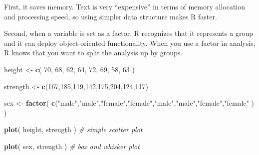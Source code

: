 \documentclass[]{book}
\newenvironment{Shaded}{\begin{snugshade}}{\end{snugshade}}
\newcommand{\CommentTok}[1]{\textcolor[rgb]{0.56,0.35,0.01}{\textit{#1}}}
\newcommand{\DecValTok}[1]{\textcolor[rgb]{0.00,0.00,0.81}{#1}}
\newcommand{\KeywordTok}[1]{\textcolor[rgb]{0.13,0.29,0.53}{\textbf{#1}}}
\newcommand{\NormalTok}[1]{#1}
\newcommand{\StringTok}[1]{\textcolor[rgb]{0.31,0.60,0.02}{#1}}
\theoremstyle{definition}
\theoremstyle{definition}
\theoremstyle{definition}
\theoremstyle{remark}
\begin{document}
First, it saves memory. Text is very ``expensive'' in terms of memory
allocation and processing speed, so using simpler data structure makes R
faster.

Second, when a variable is set as a factor, R recognizes that it
represents a group and it can deploy object-oriented functionality. When
you use a factor in analysis, R knows that you want to split the
analysis up by groups.

\begin{Shaded}
\begin{Highlighting}[]
\NormalTok{height <-}\StringTok{ }\KeywordTok{c}\NormalTok{( }\DecValTok{70}\NormalTok{, }\DecValTok{68}\NormalTok{, }\DecValTok{62}\NormalTok{, }\DecValTok{64}\NormalTok{, }\DecValTok{72}\NormalTok{, }\DecValTok{69}\NormalTok{, }\DecValTok{58}\NormalTok{, }\DecValTok{63}\NormalTok{  )}

\NormalTok{strength <-}\StringTok{ }\KeywordTok{c}\NormalTok{(}\DecValTok{167}\NormalTok{,}\DecValTok{185}\NormalTok{,}\DecValTok{119}\NormalTok{,}\DecValTok{142}\NormalTok{,}\DecValTok{175}\NormalTok{,}\DecValTok{204}\NormalTok{,}\DecValTok{124}\NormalTok{,}\DecValTok{117}\NormalTok{)}

\NormalTok{sex <-}\StringTok{ }\KeywordTok{factor}\NormalTok{( }\KeywordTok{c}\NormalTok{(}\StringTok{"male"}\NormalTok{,}\StringTok{"male"}\NormalTok{,}\StringTok{"female"}\NormalTok{,}\StringTok{"female"}\NormalTok{,}\StringTok{"male"}\NormalTok{,}\StringTok{"male"}\NormalTok{,}\StringTok{"female"}\NormalTok{,}\StringTok{"female"}\NormalTok{ ) )}

\KeywordTok{plot}\NormalTok{( height, strength )   }\CommentTok{# simple scatter plot}

\KeywordTok{plot}\NormalTok{( sex, strength )      }\CommentTok{# box and whisker plot       }
\end{Highlighting}
\end{Shaded}
\end{document}
